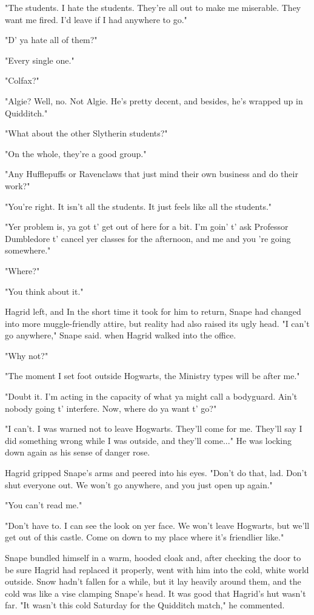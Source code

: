 "The students. I hate the students. They're all out to make me miserable. They want me fired. I'd leave if I had anywhere to go."

"D' ya hate all of them?"

"Every single one."

"Colfax?"

"Algie? Well, no. Not Algie. He's pretty decent, and besides, he's wrapped up in Quidditch."

"What about the other Slytherin students?"

"On the whole, they're a good group."

"Any Hufflepuffs or Ravenclaws that just mind their own business and do their work?"

"You're right. It isn't all the students. It just feels like all the students."

"Yer problem is, ya got t' get out of here for a bit. I'm goin' t' ask Professor Dumbledore t' cancel yer classes for the afternoon, and me and you 're going somewhere."

"Where?"

"You think about it."

Hagrid left, and In the short time it took for him to return, Snape had changed into more muggle-friendly attire, but reality had also raised its ugly head. "I can't go anywhere," Snape said. when Hagrid walked into the office.

"Why not?"

"The moment I set foot outside Hogwarts, the Ministry types will be after me."

"Doubt it. I'm acting in the capacity of what ya might call a bodyguard. Ain't nobody going t' interfere. Now, where do ya want t' go?"

"I can't. I was warned not to leave Hogwarts. They'll come for me. They'll say I did something wrong while I was outside, and they'll come..." He was locking down again as his sense of danger rose.

Hagrid gripped Snape's arms and peered into his eyes. "Don't do that, lad. Don't shut everyone out. We won't go anywhere, and you just open up again."

"You can't read me."

"Don't have to. I can see the look on yer face. We won't leave Hogwarts, but we'll get out of this castle. Come on down to my place where it's friendlier like."

Snape bundled himself in a warm, hooded cloak and, after checking the door to be sure Hagrid had replaced it properly, went with him into the cold, white world outside. Snow hadn't fallen for a while, but it lay heavily around them, and the cold was like a vise clamping Snape's head. It was good that Hagrid's hut wasn't far. "It wasn't this cold Saturday for the Quidditch match," he commented.

